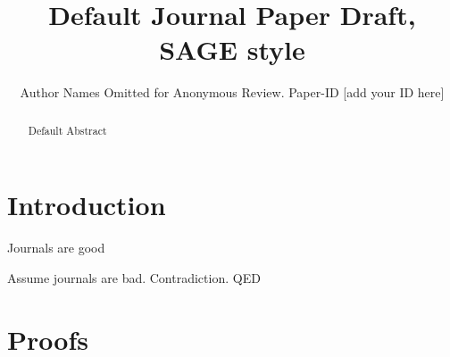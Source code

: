 \documentclass[12pt]{util/sage}
\begin{document}
\title{Default Journal Paper Draft, SAGE style}

\author{Author Names Omitted for Anonymous Review. Paper-ID [add your ID here]}
\address{LAAS-CNRS, Toulouse, France}
\maketitle
\begin{abstract}
        Default Abstract
\end{abstract}
\section{Introduction}

\begin{theorem}
        Journals are good
\end{theorem}

\begin{proofatend}
        Assume journals are bad. Contradiction. QED
\end{proofatend}

\section*{Proofs}
\printproofs


\end{document}
